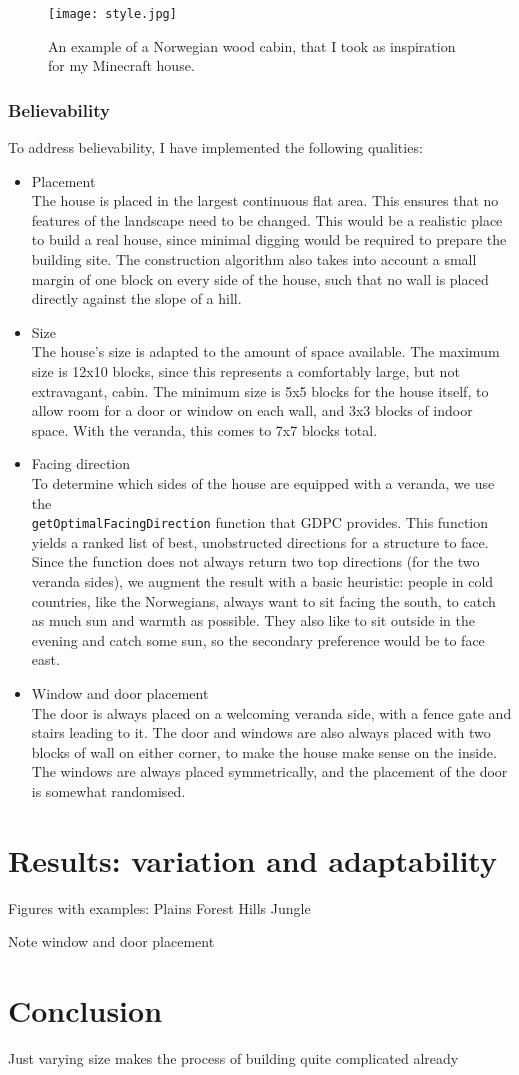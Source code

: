 \documentclass[10pt]{article}
\begin{document}
\begin{figure}
    \texttt{[image: style.jpg]}
    \centering
    \caption{An example of a Norwegian wood cabin, that I took as inspiration for my Minecraft house.}
    \label{fig:style}
\end{figure}

\subsubsection{Believability}
To address believability, I have implemented the following qualities:
\begin{itemize}
    \item Placement\\
          The house is placed in the largest continuous flat area. This ensures that no features of the landscape need to be changed. This would be a realistic place to build a real house, since minimal digging would be required to prepare the building site. The construction algorithm also takes into account a small margin of one block on every side of the house, such that no wall is placed directly against the slope of a hill.
    \item Size\\
          The house's size is adapted to the amount of space available. The maximum size is 12x10 blocks, since this represents a comfortably large, but not extravagant, cabin. The minimum size is 5x5 blocks for the house itself, to allow room for a door or window on each wall, and 3x3 blocks of indoor space. With the veranda, this comes to 7x7 blocks total.
    \item Facing direction\\
          To determine which sides of the house are equipped with a veranda, we use the\\ \texttt{getOptimalFacingDirection} function that GDPC provides. This function yields a ranked list of best, unobstructed directions for a structure to face. Since the function does not always return two top directions (for the two veranda sides), we augment the result with a basic heuristic: people in cold countries, like the Norwegians, always want to sit facing the south, to catch as much sun and warmth as possible. They also like to sit outside in the evening and catch some sun, so the secondary preference would be to face east.
    \item Window and door placement\\
          The door is always placed on a welcoming veranda side, with a fence gate and stairs leading to it. The door and windows are also always placed with two blocks of wall on either corner, to make the house make sense on the inside. The windows are always placed symmetrically, and the placement of the door is somewhat randomised.
\end{itemize}

\section{Results: variation and adaptability}
Figures with examples:
Plains
Forest
Hills
Jungle

Note window and door placement

\section{Conclusion}
Just varying size makes the process of building quite complicated already

\printbibliography
\end{document}

